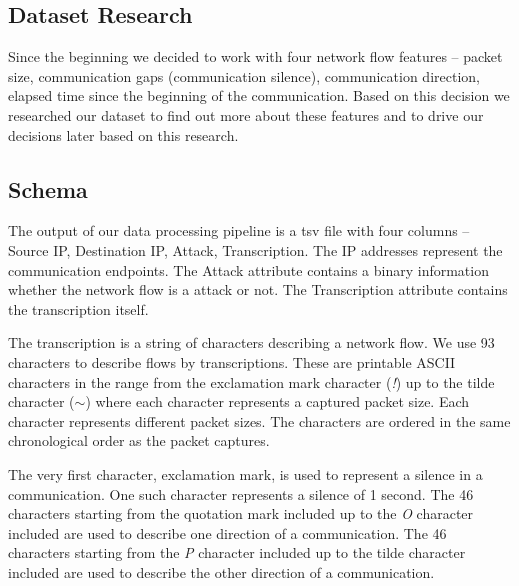 \documentclass{article}
\begin{document}
\subsection{Dataset Research}\label{sec-dataset-research}
Since the beginning we decided to work with four network flow features -- packet size, communication gaps (communication silence), communication direction, elapsed time since the beginning of the communication. Based on this decision we researched our dataset to find out more about these features and to drive our decisions later based on this research.




\subsection{Schema}
The output of our data processing pipeline is a tsv file with four columns -- Source IP, Destination IP, Attack, Transcription. The IP addresses represent the communication endpoints. The Attack attribute contains a binary information whether the network flow is a attack or not. The Transcription attribute contains the transcription itself. 

The transcription is a string of characters describing a network flow. We use 93 characters to describe flows by transcriptions. These are printable ASCII characters in the range from the exclamation mark character (\textit{!}) up to the tilde character (\textit{$\sim$}) where each character represents a captured packet size. Each character represents different packet sizes. The characters are ordered in the same chronological order as the packet captures.

The very first character, exclamation mark, is used to represent a silence in a communication. One such character represents a silence of 1 second. The 46 characters starting from the quotation mark included up to the \textit{O} character included are used to describe one direction of a communication. The 46 characters starting from the \textit{P} character included up to the tilde character included are used to describe the other direction of a communication.
\end{document}
